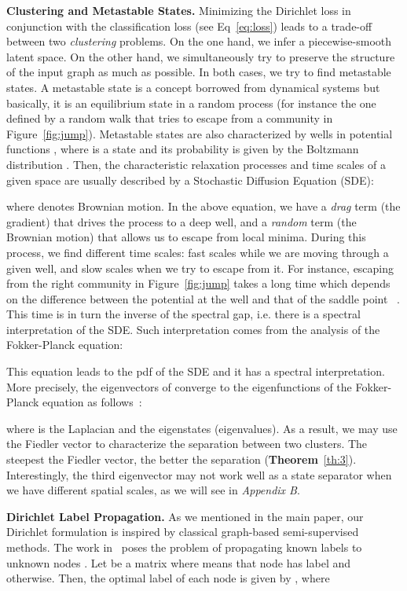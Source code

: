 \documentclass{article}
\theoremstyle{plain}
\theoremstyle{definition}
\begin{document}
\textbf{Clustering and Metastable States.} Minimizing the Dirichlet loss in conjunction with the classification loss (see Eq~\ref{eq:loss}) leads to a trade-off between two \emph{clustering} problems. On the one hand, we infer a piecewise-smooth latent space. On the other hand, we simultaneously try to preserve the structure of the input graph as much as possible. In both cases, we try to find metastable states. A metastable state is a concept borrowed from dynamical systems but basically, it is an equilibrium state in a random process (for instance the one defined by a random walk that tries to escape from a community in Figure~\ref{fig:jump}). Metastable states are also characterized by wells in potential functions , where  is a state and its probability is given by the Boltzmann distribution . 
Then, the characteristic relaxation processes and time scales of a given space are usually described by a Stochastic Diffusion Equation (SDE): 

where  denotes Brownian motion. In the above equation, we have a \emph{drag} term (the gradient) that drives the process to a deep well, and a \emph{random} term (the Brownian motion) that allows us to escape from local minima. During this process, we find different time scales: fast scales while we are moving through a given well, and slow scales when we try to escape from it. For instance, escaping from the right community in Figure~\ref{fig:jump} takes a long time which depends on the difference between the potential at the well  and that of the saddle point ~\citep{sclimitations06}. This time is in turn the inverse of the spectral gap, i.e. there is a spectral interpretation of the SDE. Such interpretation comes from the analysis of the Fokker-Planck equation:

This equation leads to the pdf of the SDE and it has a spectral interpretation. More precisely, the eigenvectors of  converge to the eigenfunctions  of the Fokker-Planck equation as follows~\citep{sclimitations06}\citep{NADLER2006113}:  

where  is the Laplacian and  the eigenstates (eigenvalues). As a result, we may use the Fiedler vector to characterize the separation between two clusters. The steepest the Fiedler vector, the better the separation (\textbf{Theorem}~\ref{th:3}). Interestingly, the third eigenvector  may not work well as a state separator when we have different spatial scales, as we will see in \emph{Appendix B}.

\textbf{Dirichlet Label Propagation.} As we mentioned in the main paper, our Dirichlet formulation is inspired by classical graph-based semi-supervised methods. The work in~\citep{Zhou03} poses the problem of propagating known labels  to unknown nodes . Let  be a  matrix where  means that node  has label  and  otherwise. Then, the optimal label of each node  is given by , where
\end{document}
